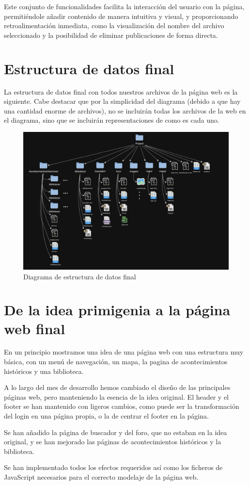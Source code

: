 \documentclass{article}
\begin{document}
Este conjunto de funcionalidades facilita la interacción del usuario con la página, permitiéndole añadir contenido de manera intuitiva y visual, y proporcionando retroalimentación inmediata, como la visualización del nombre del archivo seleccionado y la posibilidad de eliminar publicaciones de forma directa. 

\newpage

\section{Estructura de datos final}

La estructura de datos final con todos nuestros archivos de la página web es la siguiente. Cabe destacar que por la simplicidad del diagrama (debido a que hay una cantidad enorme de archivos), no se incluirán todas los archivos de la web en el diagrama, sino que se incluirán representaciones de como es cada uno.

\begin{figure}[H]
    \centering
    \includegraphics[width=1\textwidth]{jsFotos/estructuraFinal.jpg}
    \caption{Diagrama de estructura de datos final}
    \label{fig:foro_interface}
\end{figure}

\newpage

\section{De la idea primigenia a la página web final}

En un principio mostramos una idea de una página web con una estructura muy básica, con un menú de navegación, un mapa, la pagina de acontecimientos históricos y una biblioteca. 

A lo largo del mes de desarrollo hemos cambiado el diseño de las principales páginas web, pero manteniendo la esencia de la idea original. El header y el footer se han mantenido con ligeros cambios, como puede ser la transformación del login en una página propia, o la de centrar el footer en la página.

Se han añadido la página de buscador y del foro, que no estaban en la idea original, y se han mejorado las páginas de acontecimientos históricos y la biblioteca.

Se han implementado todos los efectos requeridos así como los ficheros de JavaScript necesarios para el correcto modelaje de la página web. 
\end{document}

